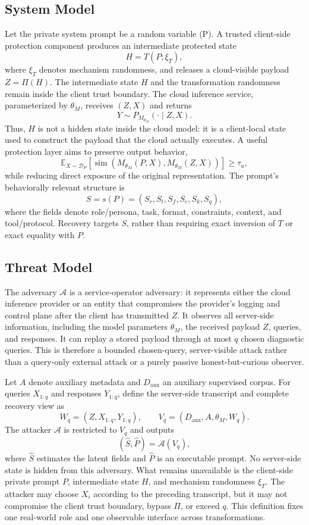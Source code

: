 \documentclass[letterpaper]{article} %
\begin{document}
\subsection{System Model}

Let the private system prompt be a random variable (P\in{}).  A trusted client-side protection component produces an intermediate protected state
\[
H=T(P;\xi_T),
\]
where \(\xi_T\) denotes mechanism randomness, and releases a cloud-visible payload \(Z=\Pi(H)\).  The intermediate state \(H\) and the transformation randomness remain inside the client trust boundary.  The cloud inference service, parameterized by \(\theta_M\), receives \((Z,X)\) and returns
\[
Y\sim P_{M_{\theta_M}}(\cdot\mid Z,X).
\]
Thus, \(H\) is not a hidden state inside the cloud model: it is a client-local state used to construct the payload that the cloud actually executes.  A useful protection layer aims to preserve output behavior,
\[
\mathbb{E}_{X\sim\mathcal{D}_P}[\operatorname{sim}(M_{\theta_M}(P,X),M_{\theta_M}(Z,X))]\geq\tau_u,
\]
while reducing direct exposure of the original representation.  The prompt's behaviorally relevant structure is
\[
S=s(P)=(S_r,S_t,S_f,S_c,S_k,S_q),
\]
where the fields denote role/persona, task, format, constraints, context, and tool/protocol.  Recovery targets \(S\), rather than requiring exact inversion of \(T\) or exact equality with \(P\).

\subsection{Threat Model}

The adversary \(\mathcal{A}\) is a service-operator adversary: it represents either the cloud inference provider or an entity that compromises the provider's logging and control plane after the client has transmitted \(Z\).  It observes all server-side information, including the model parameters \(\theta_M\), the received payload \(Z\), queries, and responses.  It can replay a stored payload through at most \(q\) chosen diagnostic queries.  This is therefore a bounded chosen-query, server-visible attack rather than a query-only external attack or a purely passive honest-but-curious observer.

Let \(A\) denote auxiliary metadata and \(D_{\mathrm{aux}}\) an auxiliary supervised corpus.  For queries \(X_{1:q}\) and responses \(Y_{1:q}\), define the server-side transcript and complete recovery view as
\[
W_q=(Z,X_{1:q},Y_{1:q}), \qquad V_q=(D_{\mathrm{aux}},A,\theta_M,W_q).
\]
The attacker \(\mathcal{A}\) is restricted to \(V_q\) and outputs
\[
(\hat{S},\hat{P})=\mathcal{A}(V_q),
\]
where \(\hat{S}\) estimates the latent fields and \(\hat{P}\) is an executable prompt.  No server-side state is hidden from this adversary.  What remains unavailable is the client-side private prompt \(P\), intermediate state \(H\), and mechanism randomness \(\xi_T\).  The attacker may choose \(X_i\) according to the preceding transcript, but it may not compromise the client trust boundary, bypass \(\Pi\), or exceed \(q\).  This definition fixes one real-world role and one observable interface across transformations.
\end{document}
